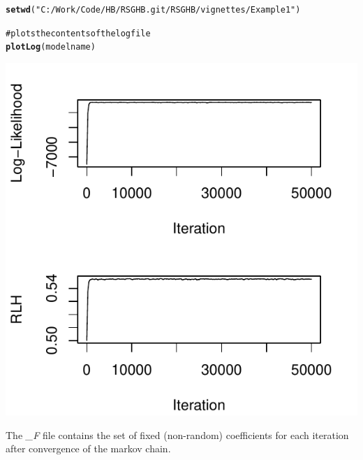 \documentclass{article}\usepackage{graphicx, color}
\makeatletter
\def\maxwidth{ %
  \ifdim\Gin@nat@width>\linewidth
    \linewidth
  \else
    \Gin@nat@width
  \fi
}
\newcommand{\hlfunctioncall}[1]{\textcolor[rgb]{0.501960784313725,0,0.329411764705882}{\textbf{#1}}}%
\newcommand{\hlstring}[1]{\textcolor[rgb]{0.6,0.6,1}{#1}}%
\newcommand{\hlcomment}[1]{\textcolor[rgb]{0.180392156862745,0.6,0.341176470588235}{#1}}%
\newenvironment{kframe}{%
 \def\at@end@of@kframe{}%
 \ifinner\ifhmode%
  \def\at@end@of@kframe{\end{minipage}}%
  \begin{minipage}{\columnwidth}%
 \fi\fi%
 \def\FrameCommand##1{\hskip\@totalleftmargin \hskip-\fboxsep
 \colorbox{shadecolor}{##1}\hskip-\fboxsep
     \hskip-\linewidth \hskip-\@totalleftmargin \hskip\columnwidth}%
 \MakeFramed {\advance\hsize-\width
   \@totalleftmargin\z@ \linewidth\hsize
   \@setminipage}}%
 {\par\unskip\endMakeFramed%
 \at@end@of@kframe}
\newenvironment{knitrout}{}{} %
\makeatother
\begin{document}
\begin{knitrout}
\color{fgcolor}\begin{kframe}
\begin{alltt}
\hlfunctioncall{setwd}(\hlstring{"C:/Work/Code/HB/RSGHB.git/RSGHB/vignettes/Example1"})

\hlcomment{# plots the contents of the log file}
\hlfunctioncall{plotLog}(modelname)
\end{alltt}
\end{kframe}
\includegraphics[width=\maxwidth]{figure/unnamed-chunk-4} 

\end{knitrout}


The \emph{\_F} file contains the set of fixed (non-random) coefficients for each iteration after convergence of the markov chain.
\end{document}
